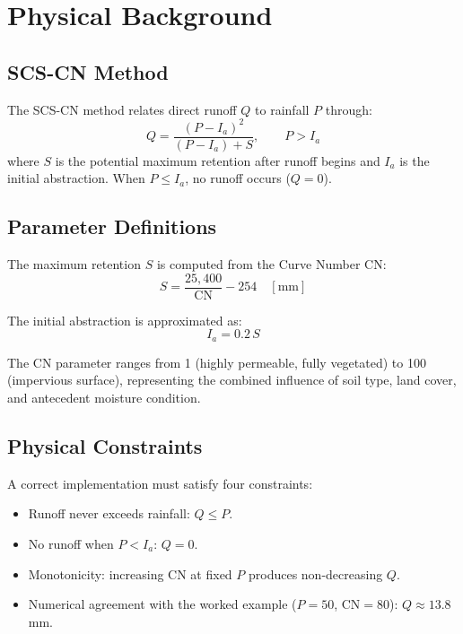 \documentclass[12pt, a4paper]{article}
\begin{document}
\section{Physical Background}

\subsection{SCS-CN Method}

The SCS-CN method relates direct runoff $Q$ to rainfall $P$ through:
\begin{equation}
  Q = \frac{(P - I_a)^2}{(P - I_a) + S}, \qquad P > I_a
\end{equation}
where $S$ is the potential maximum retention after runoff begins and $I_a$ is the initial abstraction. When $P \leq I_a$, no runoff occurs ($Q = 0$).

\subsection{Parameter Definitions}

The maximum retention $S$ is computed from the Curve Number CN:
\begin{equation}
  S = \frac{25{,}400}{\mathrm{CN}} - 254 \quad [\text{mm}]
\end{equation}

The initial abstraction is approximated as:
\begin{equation}
  I_a = 0.2\,S
\end{equation}

The CN parameter ranges from 1 (highly permeable, fully vegetated) to 100 (impervious surface), representing the combined influence of soil type, land cover, and antecedent moisture condition.

\subsection{Physical Constraints}

A correct implementation must satisfy four constraints:
\begin{itemize}[leftmargin=1.8em]
  \item Runoff never exceeds rainfall: $Q \leq P$.
  \item No runoff when $P < I_a$: $Q = 0$.
  \item Monotonicity: increasing CN at fixed $P$ produces non-decreasing $Q$.
  \item Numerical agreement with the worked example ($P=50$, CN$=80$): $Q \approx 13.8$\,mm.
\end{itemize}
\end{document}
